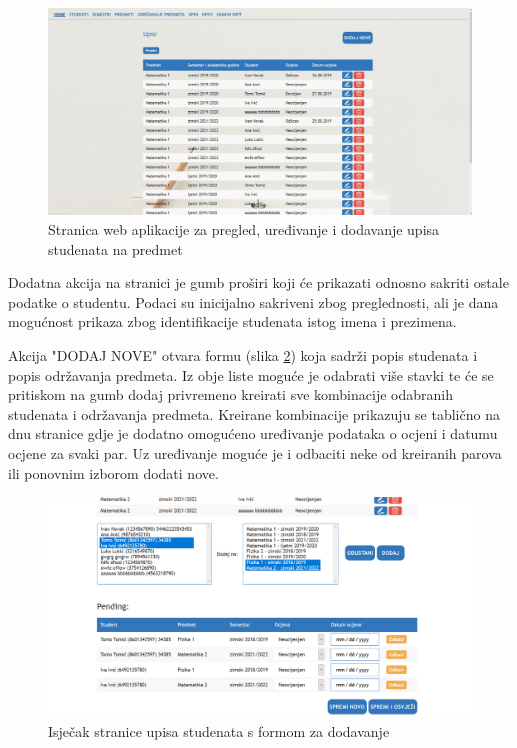 \documentclass[times, utf8, diplomski]{fer}
\begin{document}
\begin{figure}[htb]
\centering
\includegraphics[width=14cm]{upisi.jpg}
\caption{Stranica web aplikacije za pregled, uređivanje i dodavanje upisa studenata na predmet }
\label{fig:upis}
\end{figure}

Dodatna akcija na stranici je gumb proširi koji će prikazati odnosno sakriti ostale podatke o studentu. Podaci su inicijalno sakriveni zbog preglednosti, ali je dana mogućnost prikaza zbog identifikacije studenata istog imena i prezimena.

Akcija "DODAJ NOVE" otvara formu (slika \ref{fig:upisi_dodaj}) koja sadrži popis studenata i popis održavanja predmeta. Iz obje liste moguće je odabrati više stavki te će se pritiskom na gumb dodaj privremeno kreirati sve kombinacije odabranih studenata i održavanja predmeta. Kreirane kombinacije prikazuju se tablično na dnu stranice gdje je dodatno omogućeno uređivanje podataka o ocjeni i datumu ocjene za svaki par. Uz uređivanje moguće je i odbaciti neke od kreiranih parova ili ponovnim izborom dodati nove.
\hfill\break

\begin{figure}[htb]
\centering
\includegraphics[width=14cm]{upisi_dodaj.PNG}
\caption{Isječak stranice upisa studenata s formom za dodavanje  }
\label{fig:upisi_dodaj}
\end{figure}
\end{document}
